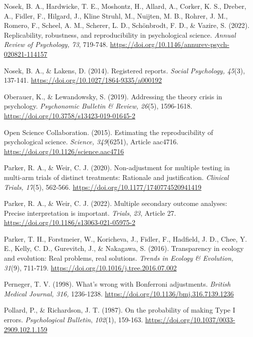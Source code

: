 \documentclass[authordate, meta]{jote-new-article}
\begin{document}
	Nosek, B. A., Hardwicke, T. E., Moshontz, H., Allard, A., Corker, K. S., Dreber, A., Fidler, F., Hilgard, J., Kline Struhl, M., Nuijten, M. B., Rohrer, J. M., Romero, F., Scheel, A. M., Scherer, L. D., Schönbrodt, F. D., \& Vazire, S. (2022). Replicability, robustness, and reproducibility in psychological science. \emph{Annual Review of Psychology, 73}, 719-748. \url{https://doi.org/10.1146/annurev-psych-020821-114157}



	Nosek, B. A., \& Lakens, D. (2014). Registered reports\emph{. Social Psychology, 45}(3), 137-141. \url{https://doi.org/10.1027/1864-9335/a000192}



	Oberauer, K., \& Lewandowsky, S. (2019). Addressing the theory crisis in psychology. \emph{Psychonomic Bulletin \& Review, 26}(5), 1596-1618. \url{https://doi.org/10.3758/s13423-019-01645-2}



	Open Science Collaboration. (2015). Estimating the reproducibility of psychological science. \emph{Science, 349}(6251), Article aac4716. \url{https://doi.org/10.1126/science.aac4716}



	Parker, R. A., \& Weir, C. J. (2020). Non-adjustment for multiple testing in multi-arm trials of distinct treatments: Rationale and justification. \emph{Clinical Trials, 17}(5), 562-566. \url{https://doi.org/10.1177/1740774520941419}



	Parker, R. A., \& Weir, C. J. (2022). Multiple secondary outcome analyses: Precise interpretation is important. \emph{Trials}, \emph{23}, Article 27. \url{https://doi.org/10.1186/s13063-021-05975-2}



	Parker, T. H., Forstmeier, W., Koricheva, J., Fidler, F., Hadfield, J. D., Chee, Y. E., Kelly, C. D., Gurevitch, J., \& Nakagawa, S. (2016). Transparency in ecology and evolution: Real problems, real solutions. \emph{Trends in Ecology \& Evolution, 31}(9), 711-719. \url{https://doi.org/10.1016/j.tree.2016.07.002}



	Perneger, T. V. (1998). What's wrong with Bonferroni adjustments. \emph{British Medical Journal, 316,} 1236-1238. \url{https://doi.org/10.1136/bmj.316.7139.1236}



	Pollard, P., \& Richardson, J. T. (1987). On the probability of making Type I errors. \emph{Psychological Bulletin}, \emph{102}(1), 159-163. \url{https://doi.org/10.1037/0033-2909.102.1.159}
\end{document}
